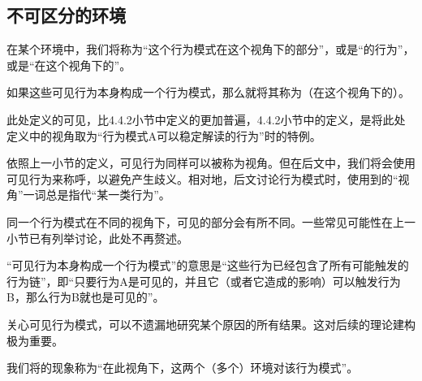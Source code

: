 \subsection{不可区分的环境}
在某个环境中，我们将称为“这个行为模式在这个视角下的部分”，或是“的行为”，或是“在这个视角下的”。

如果这些可见行为本身构成一个行为模式，那么就将其称为（在这个视角下的）。
\begin{explain}
此处定义的可见，比4.4.2小节中定义的更加普遍，4.4.2小节中的定义，是将此处定义中的视角取为“行为模式A可以稳定解读的行为”时的特例。

依照上一小节的定义，可见行为同样可以被称为视角。但在后文中，我们将会使用可见行为来称呼，以避免产生歧义。相对地，后文讨论行为模式时，使用到的“视角”一词总是指代“某一类行为”。

同一个行为模式在不同的视角下，可见的部分会有所不同。一些常见可能性在上一小节已有列举讨论，此处不再赘述。

“可见行为本身构成一个行为模式”的意思是“这些行为已经包含了所有可能触发的行为链”，即“只要行为A是可见的，并且它（或者它造成的影响）可以触发行为B，那么行为B就也是可见的”。

关心可见行为模式，可以不遗漏地研究某个原因的所有结果。这对后续的理论建构极为重要。
\end{explain}
我们将的现象称为“在此视角下，这两个（多个）环境对该行为模式”。
